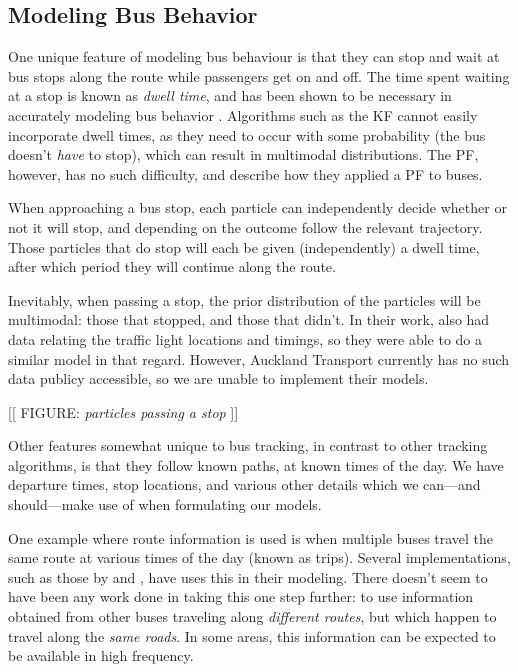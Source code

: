 \documentclass[12pt,a4paper]{article}
\begin{document}
\subsection{Modeling Bus Behavior}
\label{sec:busbehavior}


One unique feature of modeling bus behaviour is that 
they can stop and wait at bus stops along the route
while passengers get on and off.
The time spent waiting at a stop is known as \emph{dwell time},
and has been shown to be necessary in accurately modeling bus behavior \citep{cn}.
Algorithms such as the KF cannot easily incorporate dwell times,
as they need to occur with some probability (the bus doesn't \emph{have} to stop),
which can result in multimodal distributions.
The PF, however, has no such difficulty,
and \cite{hans-etal:2015} describe how they applied a PF to buses.


When approaching a bus stop,
each particle can independently decide whether or not it will stop,
and depending on the outcome follow the relevant trajectory.
Those particles that do stop will each be given (independently)
a dwell time, after which period they will continue along the route.

Inevitably, when passing a stop, the prior distribution of the particles will be multimodal:
those that stopped, and those that didn't.
In their work, \cite{hans-etal:2015} also had data relating the traffic light locations and
timings, so they were able to do a similar model in that regard.
However, Auckland Transport currently has no such data publicy accessible,
so we are unable to implement their models.

[[ FIGURE: \emph{particles passing a stop} ]]


Other features somewhat unique to bus tracking, 
in contrast to other tracking algorithms,
is that they follow known paths, at known times of the day.
We have departure times, stop locations, 
and various other details which we can---and should---make use of 
when formulating our models.


One example where route information is used is when multiple buses travel the same 
route at various times of the day (known as trips).
Several implementations, such as those by \cite{yu-etal:2011} and \cite{hans-etal:2015},
have uses this in their modeling.
There doesn't seem to have been any work done in taking this one step further:
to use information obtained from other buses traveling along \emph{different routes},
but which happen to travel along the \emph{same roads}.
In some areas, this information can be expected to be available in high 
frequency.
\end{document}
